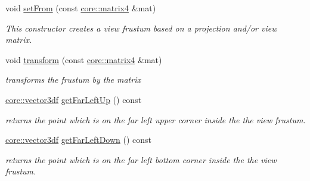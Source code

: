 \begin{DoxyCompactItemize}
\mbox{\label{structirr_1_1scene_1_1SViewFrustum_a2517bde9292aa26119d75b9ff0b92833}} 
void \hyperlink{structirr_1_1scene_1_1SViewFrustum_a2517bde9292aa26119d75b9ff0b92833}{set\+From} (const \hyperlink{namespaceirr_1_1core_a4c9d4e29899535971052810954a14431}{core\+::matrix4} \&mat)
\begin{DoxyCompactList}\small\item\em This constructor creates a view frustum based on a projection and/or view matrix. \end{DoxyCompactList}\item 
void \hyperlink{structirr_1_1scene_1_1SViewFrustum_aeabadaf532f08ba3cb98b897ff0619f2}{transform} (const \hyperlink{namespaceirr_1_1core_a4c9d4e29899535971052810954a14431}{core\+::matrix4} \&mat)
\begin{DoxyCompactList}\small\item\em transforms the frustum by the matrix \end{DoxyCompactList}\item 
\mbox{\label{structirr_1_1scene_1_1SViewFrustum_aa88c3024a6d2b5dc67e53014d2632df8}} 
\hyperlink{namespaceirr_1_1core_ae6e2b2a6c552833ebbd5b7463d03586b}{core\+::vector3df} \hyperlink{structirr_1_1scene_1_1SViewFrustum_aa88c3024a6d2b5dc67e53014d2632df8}{get\+Far\+Left\+Up} () const
\begin{DoxyCompactList}\small\item\em returns the point which is on the far left upper corner inside the the view frustum. \end{DoxyCompactList}\item 
\mbox{\label{structirr_1_1scene_1_1SViewFrustum_a83216ce3be2990e7e4849bf985d89fd6}} 
\hyperlink{namespaceirr_1_1core_ae6e2b2a6c552833ebbd5b7463d03586b}{core\+::vector3df} \hyperlink{structirr_1_1scene_1_1SViewFrustum_a83216ce3be2990e7e4849bf985d89fd6}{get\+Far\+Left\+Down} () const
\begin{DoxyCompactList}\small\item\em returns the point which is on the far left bottom corner inside the the view frustum. \end{DoxyCompactList}\item 
\mbox{\label{structirr_1_1scene_1_1SViewFrustum_a2cce344ced4939aebfe3c9d9396cb4ec}} 

\end{DoxyCompactItemize}
